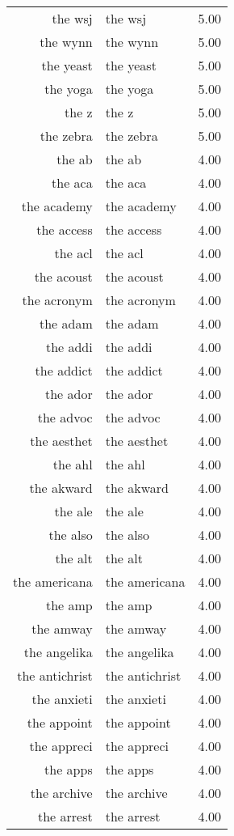 \begin{table}[ht]
\begin{tabular}{rlr}
  the wsj & the wsj & 5.00 \\ 
  the wynn & the wynn & 5.00 \\ 
  the yeast & the yeast & 5.00 \\ 
  the yoga & the yoga & 5.00 \\ 
  the z & the z & 5.00 \\ 
  the zebra & the zebra & 5.00 \\ 
  the ab & the ab & 4.00 \\ 
  the aca & the aca & 4.00 \\ 
  the academy & the academy & 4.00 \\ 
  the access & the access & 4.00 \\ 
  the acl & the acl & 4.00 \\ 
  the acoust & the acoust & 4.00 \\ 
  the acronym & the acronym & 4.00 \\ 
  the adam & the adam & 4.00 \\ 
  the addi & the addi & 4.00 \\ 
  the addict & the addict & 4.00 \\ 
  the ador & the ador & 4.00 \\ 
  the advoc & the advoc & 4.00 \\ 
  the aesthet & the aesthet & 4.00 \\ 
  the ahl & the ahl & 4.00 \\ 
  the akward & the akward & 4.00 \\ 
  the ale & the ale & 4.00 \\ 
  the also & the also & 4.00 \\ 
  the alt & the alt & 4.00 \\ 
  the americana & the americana & 4.00 \\ 
  the amp & the amp & 4.00 \\ 
  the amway & the amway & 4.00 \\ 
  the angelika & the angelika & 4.00 \\ 
  the antichrist & the antichrist & 4.00 \\ 
  the anxieti & the anxieti & 4.00 \\ 
  the appoint & the appoint & 4.00 \\ 
  the appreci & the appreci & 4.00 \\ 
  the apps & the apps & 4.00 \\ 
  the archive & the archive & 4.00 \\ 
  the arrest & the arrest & 4.00 \\ 

\end{tabular}
\end{table}

